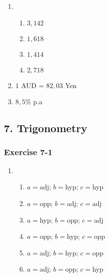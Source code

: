 {\begin{multicols}{3}
\begin{enumerate}[label=\textbf{\arabic*}.]
\begin{enumerate}[noitemsep, label=\textbf{(\alph*)} ]
	    \item Compound interest%
	\end{enumerate}

	\item %
	\begin{enumerate}[noitemsep, label=\textbf{(\alph*)} ]
\item $3,142$
\item $1,618$
\item $1,414$
\item $2,718$
	\end{enumerate}

	\item $1$ AUD = $82,03$ Yen%

	\item $8,5\%$ p.a%
    \end{enumerate}


\end{multicols}

\subsection* {7. Trigonometry}
\begin{multicols}{3}
\subsubsection*{Exercise 7-1} %

\begin{enumerate}[noitemsep, label=\textbf{\arabic*}. ]
\item %
\begin{enumerate}[noitemsep, label=\textbf{(\alph*)} ]
\item $a=$adj; $b=$hyp; $c=$hyp
\item $a=$opp; $b=$adj; $c=$adj
\item $a=$hyp; $b=$opp; $c=$adj
\item $a=$opp; $b=$hyp; $c=$opp
\item $a=$adj; $b=$hyp; $c=$opp
\item $a=$adj; $b=$opp; $c=$hyp
\end{enumerate}




\end{enumerate}
\end{multicols}}
